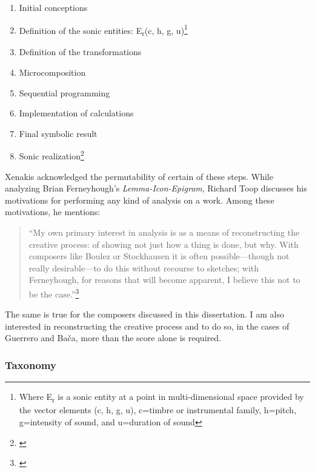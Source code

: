 \begin{enumerate}
  \item Initial conceptions
  \item Definition of the sonic entities: E\textsubscript{r}(c, h, g, u)\footnote{Where E\textsubscript{r} is a sonic entity at a point in multi-dimensional space provided by the vector elements (c, h, g, u), c=timbre or instrumental family, h=pitch, g=intensity of sound, and u=duration of sound}
  \item Definition of the transformations
  \item Microcomposition
  \item Sequential programming
  \item Implementation of calculations
  \item Final symbolic result
  \item Sonic realization\footnote{\citet[22]{xenakis}}
\end{enumerate}

Xenakis acknowledged the permutability of certain of these steps. While analyzing Brian Ferneyhough's \textit{Lemma-Icon-Epigram}, Richard Toop discusses his motivations for performing any kind of analysis on a work. Among these motivations, he mentions:

\begin{quote}
\singlespacing
``My own primary interest in analysis is as a means of reconstructing the creative process: of showing not just how a thing is done, but why. With composers like Boulez or Stockhausen it is often possible—though not really desirable—to do this without recourse to sketches; with Ferneyhough, for reasons that will become apparent, I believe this not to be the case.''\footnote{\citet[54]{toop}}
\end{quote}

The same is true for the composers discussed in this dissertation. I am also interested in reconstructing the creative process and to do so, in the cases of Guerrero and Bača, more than the score alone is required. %

\subsubsection{Taxonomy}

